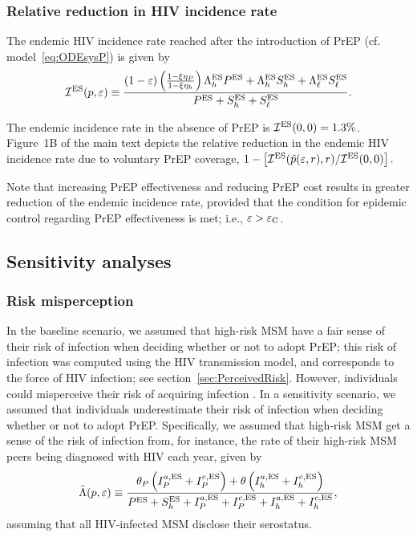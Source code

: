 \documentclass[12pt]{article}
\begin{document}
 
\subsubsection{Relative reduction in HIV incidence rate}

The endemic HIV incidence rate reached after the introduction of PrEP (cf. model~\eqref{eq:ODEsysP}) is given by
\begin{equation}
	\mathcal{I}^{\rm ES}(p, \varepsilon) \equiv \frac{(1-\varepsilon) \left(\frac{1-\xi \eta_P}{1-\xi \eta_h}\right) \Lambda_h^{\rm ES} P^{\rm ES} + \Lambda_h^{\rm ES} S_h^{\rm ES} + \Lambda_\ell^{\rm ES} S_\ell^{\rm ES}}{P^{\rm ES} + S_h^{\rm ES} + S_\ell^{\rm ES}}.
\end{equation}

The endemic incidence rate in the absence of PrEP is $\mathcal{I}^{\rm ES}(0, 0) = 1.3\%$. Figure~1B of the main text depicts the relative reduction in the endemic HIV incidence rate due to voluntary PrEP coverage, $1- \left[\mathcal{I}^{\rm ES}(\hat{p}(\varepsilon,r),r) / \mathcal{I}^{\rm ES}(0, 0)\right].$

Note that increasing PrEP effectiveness and reducing PrEP cost results in greater reduction of the endemic incidence rate, provided that the condition for epidemic control regarding PrEP effectiveness is met; i.e., $\varepsilon > \varepsilon_{\rm C}$.


\subsection{Sensitivity analyses}
\subsubsection{Risk misperception}

In the baseline scenario, we assumed that high-risk MSM have a fair sense of their risk of infection when deciding whether or not to adopt PrEP; this risk of infection was computed using the HIV transmission model, and corresponds to the force of HIV infection; see section~\ref{sec:PerceivedRisk}. However, individuals could misperceive their risk of acquiring infection \cite{Blumenthal2019}.  In a sensitivity scenario, we assumed that individuals underestimate their risk of infection when deciding whether or not to adopt PrEP. Specifically, we assumed that high-risk MSM get a sense of the risk of infection from, for instance, the rate of their high-risk MSM peers being diagnosed with HIV each year, given by
\begin{equation}
	\tilde{\Lambda} (p, \varepsilon) \equiv \frac{\theta_P \left(I_P^{a,\rm ES} + I_P^{c,\rm ES}\right) + \theta \left(I_h^{a,\rm ES} + I_h^{c,\rm ES}\right)}{P^{\rm ES} + S_h^{\rm ES} + I_P^{a,\rm ES} + I_P^{c,\rm ES} + I_h^{a,\rm ES} + I_h^{c,\rm ES}} ,
\end{equation}
{assuming that all HIV-infected MSM disclose their serostatus}.
\end{document}
